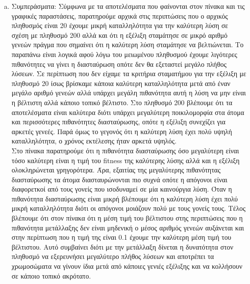 \documentclass[12pt,a4paper]{article}
\newcommand{\tl}{\textlatin}
\begin{document}
\begin{enumerate}[a)]
\begin{figure}[H]
\begin{subfigure}[ht]{0.7\textwidth}
                         \caption*{Περίπτωση: 200, 0.1 ,0.01}
                     \end{subfigure}
                \end{figure} 
            \item Συμπεράσματα: 
                    Σύμφωνα με τα αποτελέσματα που 
                    φαίνονται στον πίνακα και τις γραφικές παραστάσεις, παρατηρούμε αρχικά
                    στις περιπτώσεις που ο αρχικός πληθυσμός
                    είναι 20 έχουμε  μικρή καταλληλότητα για την καλύτερη λύση
                    σε σχέση με πληθυσμό 200 αλλά και
                    ότι η εξέλιξη σταμάτησε σε μικρό αριθμό
                    γενεών πράγμα που σημαίνει ότι η καλύτερη λύση σταμάτησε να βελτιώνεται.
                    Το παραπάνω είναι λογικά αφού λόγω του μειωμένου
                    πληθυσμού έχουμε λιγότερες πιθανότητες να γίνει η διασταύρωση
                    οπότε δεν θα εξεταστεί μεγάλο πλήθος λύσεων. Σε περίπτωση 
                    που δεν είχαμε τα κριτήρια σταματήμου για
                    την εξέλιξη με πληθυσμό 20 ίσως βρίσκαμε κάποια καλύτερη καταλληλότητα
                    μετά από έναν μεγάλο αριθμό γενεών αλλά υπάρχει μεγάλη
                    πιθανότητα αυτή η λύση να μην είναι η βέλτιστη αλλά κάποιο
                    τοπικό βέλτιστο. Στο
                    πληθυσμό 200 βλέπουμε ότι τα αποτελέσματα είναι καλύτερα διότι υπάρχει 
                    μεγαλύτερη ποικιλομορφία στα άτομα και περισσότερες
                    πιθανότητες διασταύρωσης, οπότε η
                    εξέλιξη συνεχίζει για αρκετές γενεές. Παρά όμως το γεγονός
                    ότι η καλύτερη λύση έχει πολύ υψηλή καταλληλότητα, ο χρόνος
                    εκτέλεσης ήταν αρκετά υψηλός.\\
                    Στο πίνακα παρατηρούμε ότι η πιθανότητα
                    διασταύρωσης όσο μεγαλύτερη είναι τόσο καλύτερη είναι η τιμή του
                    \tl{fitness} της καλύτερης λύσης αλλά και
                    η εξέλιξη ολοκληρώνεται γρηγορότερα. Άρα, εξαιτίας της μεγαλύτερης
                    πιθανότητας διασταύρωσης τα άτομα 
                    διασταυρώνονται πιο συχνά οπότε η απόγονοι είναι
                    διαφορετκοί από τους γονείς που ισοδυναμεί σε μία
                    καινούργια
                    λύση. Όταν η πιθανότητα διασταύρωσης είναι μικρή βλέπουμε ότι
                    η καλύτερη λύση έχει πολύ μικρή καταλληλότητα διότι οι
                    απόγονοι μοιάζουν πολύ με τους γονείς τους. Τέλος βλέπουμε ότι στον πίνακα ότι
                    η μέση τιμή του βέλτιστου στης περιπτώσεις που η πιθανότητα
                    μετάλλαξης δεν είναι μηδενική ο μέσος αριθμός
                    γενεών αυξάνεται και στην περίπτωση που η τιμή της είναι 0.1
                    έχουμε την καλύτερη μέση τιμή του βέλτιστου.
                    Αυτό συμβαίνει διότι με την μετάλλαξη δίνεται η δυνατότητα στον
                    πληθυσμό να εξερευνήσει μεγαλύτερο πλήθος
                    λύσεων και αποτρέπει τα χρωμοσώματα να γίνουν ίδια μετά από κάποιες
                    γενιές εξέλιξης και να κολλήσουν σε κάποιο τοπικό ακρότατο.
        \end{enumerate}
\end{document}
